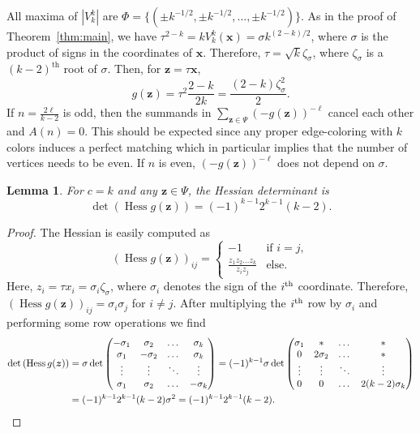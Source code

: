 \documentclass[a4paper,oneside]{amsart}
\newcommand{\bb}[1]{\boldsymbol{#1}}
\numberwithin{theorem}{section}
\newtheorem{lemma}[theorem]{Lemma}
\theoremstyle{remark}
\DeclareMathOperator{\Hess}{Hess}
\begin{document}
All maxima of $|V^k_k|$ are $\Phi = \{ ( \pm k^{-1/2}, \pm k^{-1/2}, \dots, \pm k^{-1/2} ) \}$. 
As in the proof of Theorem~\ref{thm:main}, we have $\tau^{2-k} = kV^k_k(\bb{x}) = \sigma k^{(2-k)/2}$, where $\sigma$ is the product of signs in the coordinates of $\bb{x}$. 
Therefore, $\tau = \sqrt{k} \zeta_{\sigma}$, where $\zeta_{\sigma}$ is a $(k-2)^{\text{th}}$ root of $\sigma$. Then, for $\bb{z} = \tau\bb{x}$, 
\begin{equation}
  \label{eq:g_c=k}
  g(\bb{z}) = \tau^2 \frac{2-k}{2k} = \frac{(2-k)\zeta_\sigma^2}{2}.
\end{equation}
If $n = \frac{2\ell}{k-2}$ is odd, then the summands in $\sum_{\bb{z}\in\Psi} (-g(\bb{z}))^{-\ell}$ cancel each other and $A(n) = 0$. This should be expected since any proper edge-coloring with $k$ colors induces a perfect matching which in particular implies that the number of vertices needs to be even. If $n$ is even, $(-g(\bb{z}))^{-\ell}$ does not depend on $\sigma$.

\begin{lemma}
  \label{lem:Hess_det}
  For $c=k$ and any $\bb{z}\in\Psi$, the Hessian determinant is 
  \[\det \left( \Hess g(\bb{z}) \right) = (-1)^{k-1} 2^{k-1}(k-2).\]
\end{lemma}

\begin{proof}
  The Hessian is easily computed as
  \[
    (\Hess g(\bb{z}))_{ij} = \left\{ \begin{array}{ll}
      -1 & \text{if } i=j, \\
      \frac{z_1z_2\dots z_k}{z_i z_j} & \text{else.} 
    \end{array} \right.
  \]
  Here, $z_i = \tau x_i = \sigma_i \zeta_\sigma$, where $\sigma_i$ denotes the sign of the $i^{\rm th}$ coordinate. Therefore, $(\Hess g(\bb{z}))_{ij} = \sigma_i\sigma_j$ for $i\neq j$. After multiplying the $i^{\rm th}$ row by $\sigma_i$ and performing some row operations we find
  \begin{align*}
    \det \left( \Hess g(\bb{z}) \right) & = \sigma \det \begin{pmatrix}
      -\sigma_1 & \sigma_2 & \dots & \sigma_k \\
      \sigma_1 & -\sigma_2 & \dots & \sigma_k \\
      \vdots & \vdots & \ddots & \vdots \\ 
      \sigma_1 & \sigma_2 & \dots & -\sigma_k \\
    \end{pmatrix}
    = (-1)^{k-1} \sigma \det \begin{pmatrix}
      \sigma_1 & \ast & \dots & \ast \\
      0 & 2\sigma_2 & \dots & \ast \\
      \vdots & \vdots & \ddots & \vdots \\ 
      0 & 0 & \dots & 2(k-2)\sigma_k \\
    \end{pmatrix} \\
    & = (-1)^{k-1} 2^{k-1} (k-2) \sigma^2 = (-1)^{k-1} 2^{k-1} (k-2). \qedhere
  \end{align*}
\end{proof}
\end{document}
